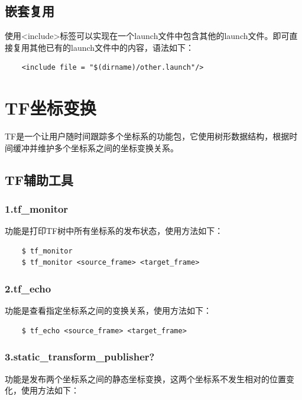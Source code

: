 \documentclass[9pt, oneside]{book}
\begin{document}
\subsection{嵌套复用}

使用<include>标签可以实现在一个launch文件中包含其他的launch文件。即可直接复用其他已有的launch文件中的内容，语法如下：

\begin{verbatim}
    <include file = "$(dirname)/other.launch"/>
\end{verbatim}

\section{TF坐标变换}

TF是一个让用户随时间跟踪多个坐标系的功能包，它使用树形数据结构，根据时间缓冲并维护多个坐标系之间的坐标变换关系。

\subsection{TF辅助工具}

\subsubsection{1.tf\_monitor}

功能是打印TF树中所有坐标系的发布状态，使用方法如下：

\begin{verbatim}
    $ tf_monitor
    $ tf_monitor <source_frame> <target_frame>
\end{verbatim}

\subsubsection{2.tf\_echo}

功能是查看指定坐标系之间的变换关系，使用方法如下：

\begin{verbatim}
    $ tf_echo <source_frame> <target_frame>
\end{verbatim}

\subsubsection{3.static\_transform\_publisher?}

功能是发布两个坐标系之间的静态坐标变换，这两个坐标系不发生相对的位置变化，使用方法如下：
\end{document}
